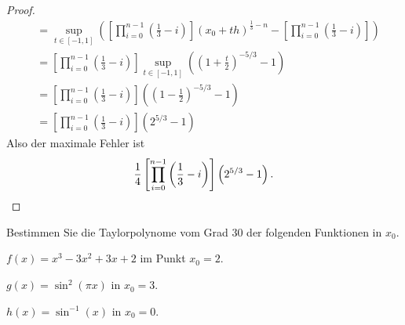 \begin{proof}
\begin{align*}
	&= \sup_{t\in [-1,1]}\left( \left[\prod_{i=0}^{n-1}\left( \frac{1}{3}-i \right) \right] \left( x_0+th \right) ^{\frac{1}{3}-n}-\left[ \prod_{i=0}^{n-1}\left( \frac{1}{3}-i \right)    \right]    \right)\\
	&= \left[ \prod_{i=0}^{n-1}\left( \frac{1}{3}-i \right) \right]\sup_{t\in[-1,1]}\left( \left(1+\frac{t}{2}\right)^{- 5 / 3}-1 \right) \\
	&=\left[ \prod_{i=0}^{n-1} \left( \frac{1}{3}-i \right)  \right]\left( \left( 1-\frac{1}{2} \right)^{- 5 / 3}-1 \right)\\
	&=\left[ \prod_{i=0}^{n-1}\left( \frac{1}{3}-i \right) \right] \left( 2^{5 / 3}-1 \right)  
\end{align*}
Also der maximale Fehler ist
\[
	\frac{1}{4}\left[ \prod_{i=0}^{n-1} \left( \frac{1}{3}-i \right)   \right] \left( 2^{5 / 3}-1 \right) 
.\qedhere\]
\end{proof}
\begin{Problem}
	Bestimmen Sie die Taylorpolynome vom Grad 30 der folgenden Funktionen in $x_0$.
	\begin{parts}
	\item $f(x)=x^3-3x^2+3x+2$ im Punkt $x_0=2$.
	\item $g(x)=\sin^2\left( \pi x \right) $ in $x_0=3$.
	\item $h(x)=\sin^{-1}(x)$ in $x_0=0$.
	\end{parts}
\end{Problem}
